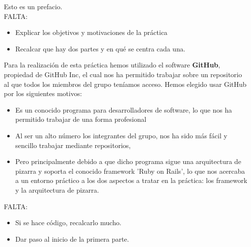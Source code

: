 \lettrine[lines=1,slope=4pt,findent=0pt]{E}{}sto es un prefacio.\\

\color{red}
FALTA:
\begin{itemize}
\item Explicar los objetivos y motivaciones de la práctica
\item Recalcar que hay dos partes y en qué se centra cada una.
\end{itemize}
\color{black}

Para la realización de esta práctica hemos utilizado el software {\bf GitHub}, propiedad de 	GitHub Inc, el cual nos ha permitido trabajar sobre un repositorio al que todos los miembros del grupo teníamos acceso. Hemos elegido usar GitHub por los siguientes motivos:
\begin{itemize}
	\item Es un conocido programa para desarrolladores de software, lo que nos ha permitido trabajar de una forma profesional
	\item Al ser un alto número los integrantes del grupo, nos ha sido más fácil y sencillo trabajar mediante repositorios, 
	\item Pero principalmente debido a que dicho programa sigue una arquitectura de pizarra y soporta el conocido framework 'Ruby on Rails', lo que nos acercaba a un entorno práctico a los dos aspectos a tratar en la práctica: los framework y la arquitectura de pizarra.
\end{itemize}

\color{red}
FALTA:
\begin{itemize}
\item Si se hace código, recalcarlo mucho.
\item Dar paso al inicio de la primera parte.
\end{itemize}
\color{black}